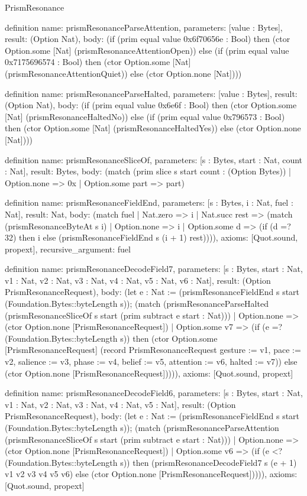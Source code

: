 \begin{lexlean}{PrismResonance}
\begin{semanticmodule}
definition{
  name: prismResonanceParseAttention,
  parameters: [value : Bytes],
  result: (Option Nat),
  body: (if (prim equal value 0x6f70656e : Bool) then (ctor Option.some [Nat] (prismResonanceAttentionOpen)) else (if (prim equal value 0x7175696574 : Bool) then (ctor Option.some [Nat] (prismResonanceAttentionQuiet)) else (ctor Option.none [Nat])))
}

definition{
  name: prismResonanceParseHalted,
  parameters: [value : Bytes],
  result: (Option Nat),
  body: (if (prim equal value 0x6e6f : Bool) then (ctor Option.some [Nat] (prismResonanceHaltedNo)) else (if (prim equal value 0x796573 : Bool) then (ctor Option.some [Nat] (prismResonanceHaltedYes)) else (ctor Option.none [Nat])))
}

definition{
  name: prismResonanceSliceOf,
  parameters: [s : Bytes, start : Nat, count : Nat],
  result: Bytes,
  body: (match (prim slice s start count : (Option Bytes))
    | Option.none => 0x
    | Option.some part => part)
}

definition{
  name: prismResonanceFieldEnd,
  parameters: [s : Bytes, i : Nat, fuel : Nat],
  result: Nat,
  body: (match fuel
    | Nat.zero => i
    | Nat.succ rest => (match (prismResonanceByteAt s i)
      | Option.none => i
      | Option.some d => (if (d =? 32) then i else (prismResonanceFieldEnd s (i + 1) rest)))),
  axioms: [Quot.sound, propext],
  recursive_argument: fuel
}

definition{
  name: prismResonanceDecodeField7,
  parameters: [s : Bytes, start : Nat, v1 : Nat, v2 : Nat, v3 : Nat, v4 : Nat, v5 : Nat, v6 : Nat],
  result: (Option PrismResonanceRequest),
  body: (let e : Nat := (prismResonanceFieldEnd s start (Foundation.Bytes::byteLength s)); (match (prismResonanceParseHalted (prismResonanceSliceOf s start (prim subtract e start : Nat)))
    | Option.none => (ctor Option.none [PrismResonanceRequest])
    | Option.some v7 => (if (e =? (Foundation.Bytes::byteLength s)) then (ctor Option.some [PrismResonanceRequest] (record PrismResonanceRequest {gesture := v1, pace := v2, salience := v3, phase := v4, belief := v5, attention := v6, halted := v7})) else (ctor Option.none [PrismResonanceRequest])))),
  axioms: [Quot.sound, propext]
}

definition{
  name: prismResonanceDecodeField6,
  parameters: [s : Bytes, start : Nat, v1 : Nat, v2 : Nat, v3 : Nat, v4 : Nat, v5 : Nat],
  result: (Option PrismResonanceRequest),
  body: (let e : Nat := (prismResonanceFieldEnd s start (Foundation.Bytes::byteLength s)); (match (prismResonanceParseAttention (prismResonanceSliceOf s start (prim subtract e start : Nat)))
    | Option.none => (ctor Option.none [PrismResonanceRequest])
    | Option.some v6 => (if (e <? (Foundation.Bytes::byteLength s)) then (prismResonanceDecodeField7 s (e + 1) v1 v2 v3 v4 v5 v6) else (ctor Option.none [PrismResonanceRequest])))),
  axioms: [Quot.sound, propext]
}


\end{semanticmodule}
\end{lexlean}
